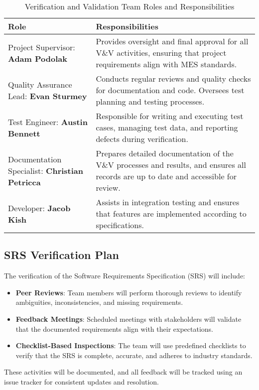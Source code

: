 \documentclass[12pt, titlepage]{article}
\begin{document}
\begin{table}[h!]
\centering
\begin{tabularx}{\textwidth}{|l|X|}
\hline
\textbf{Role} & \textbf{Responsibilities} \\
\hline
Project Supervisor: \textbf{Adam Podolak} & Provides oversight and final approval for all V\&V activities, ensuring that project requirements align with MES standards. \\
\hline
Quality Assurance Lead: \textbf{Evan Sturmey} & Conducts regular reviews and quality checks for documentation and code. Oversees test planning and testing processes. \\
\hline
Test Engineer: \textbf{Austin Bennett} & Responsible for writing and executing test cases, managing test data, and reporting defects during verification. \\
\hline
Documentation Specialist: \textbf{Christian Petricca} & Prepares detailed documentation of the V\&V processes and results, and ensures all records are up to date and accessible for review. \\
\hline
Developer: \textbf{Jacob Kish} & Assists in integration testing and ensures that features are implemented according to specifications. \\
\hline
\end{tabularx}
\caption{Verification and Validation Team Roles and Responsibilities}
\end{table}

\subsection{SRS Verification Plan}
The verification of the Software Requirements Specification (SRS) will include:
\begin{itemize}
    \item \textbf{Peer Reviews}: Team members will perform thorough reviews to identify ambiguities, inconsistencies, and missing requirements.
    \item \textbf{Feedback Meetings}: Scheduled meetings with stakeholders will validate that the documented requirements align with their expectations.
    \item \textbf{Checklist-Based Inspections}: The team will use predefined checklists to verify that the SRS is complete, accurate, and adheres to industry standards.
\end{itemize}
These activities will be documented, and all feedback will be tracked using an issue tracker for consistent updates and resolution.
\end{document}
